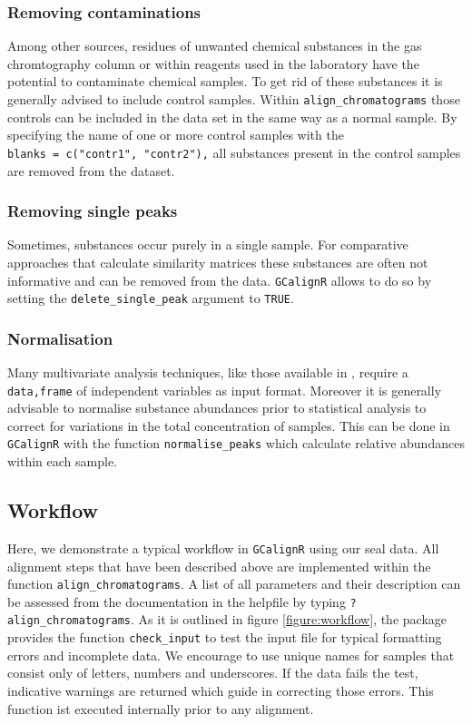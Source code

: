 \subsubsection{Removing contaminations}\label{removing-contaminations}

Among other sources, residues of unwanted chemical substances in the gas
chromtography column or within reagents used in the laboratory have the
potential to contaminate chemical samples. To get rid of these
substances it is generally advised to include control samples. Within
\texttt{align\_chromatograms} those controls can be included in the data
set in the same way as a normal sample. By specifying the name of one or
more control samples with the
\texttt{blanks\ =\ c("contr1",\ "contr2"),} all substances present in
the control samples are removed from the dataset.

\subsubsection{Removing single peaks}\label{removing-single-peaks}

Sometimes, substances occur purely in a single sample. For comparative
approaches that calculate similarity matrices these substances are often
not informative and can be removed from the data. \texttt{GCalignR}
allows to do so by setting the \texttt{delete\_single\_peak} argument to
\texttt{TRUE}.

\subsubsection{Normalisation}\label{normalisation}

Many multivariate analysis techniques, like those available in
, require a \texttt{data,frame} of independent variables as
input format. Moreover it is generally advisable to normalise substance
abundances prior to statistical analysis to correct for variations in
the total concentration of samples. This can be done in
\texttt{GCalignR} with the function \texttt{normalise\_peaks} which
calculate relative abundances within each sample.

\subsection{Workflow}\label{workflow}

Here, we demonstrate a typical workflow in \texttt{GCalignR} using our
seal data. All alignment steps that have been described above are
implemented within the function \texttt{align\_chromatograms}. A list of
all parameters and their description can be assessed from the
documentation in the helpfile by typing \texttt{?align\_chromatograms}.
As it is outlined in figure \ref{figure:workflow}, the package provides
the function \texttt{check\_input} to test the input file for typical
formatting errors and incomplete data. We encourage to use unique names
for samples that consist only of letters, numbers and underscores. If
the data fails the test, indicative warnings are returned which guide in
correcting those errors. This function ist executed internally prior to
any alignment.

